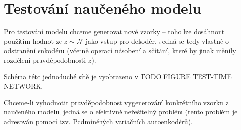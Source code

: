 \section{Testování naučeného modelu}
Pro testování modelu chceme generovat nové vzorky – toho lze dosáhnout použitím hodnot ze $z \sim \mathcal{N}$ jako vstup pro dekodér.
Jedná se tedy vlastně o odstranění enkodéru (včetně operací násobení a sčítání, které by jinak měnily rozdělení pravděpodobnosti $z$).

Schéma této jednoduché sítě je vyobrazeno v TODO FIGURE TEST-TIME NETWORK.

Chceme-li vyhodnotit pravděpodobnost vygenerování konkrétního vzorku z naučeného modelu, jedná se o efektivně neřešitelný problém (tento problém je adresován pomocí tzv. Podmíněných variačních autoenkodérů).